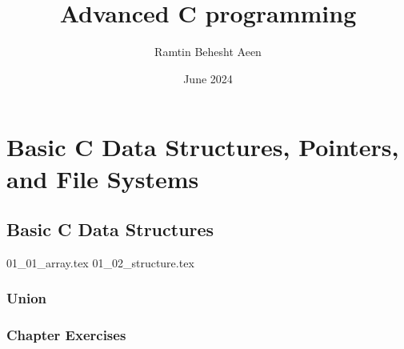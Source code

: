 \documentclass{book}
\title{Advanced C programming}
\author{Ramtin Behesht Aeen}
\date{June 2024}
\begin{document}
\maketitle

\part{ Basic C Data Structures, Pointers, and File Systems}
\chapter{Basic C Data Structures}

{01_01_array.tex}
{01_02_structure.tex}


\section{Union}
\section{Chapter Exercises}
\end{document}
